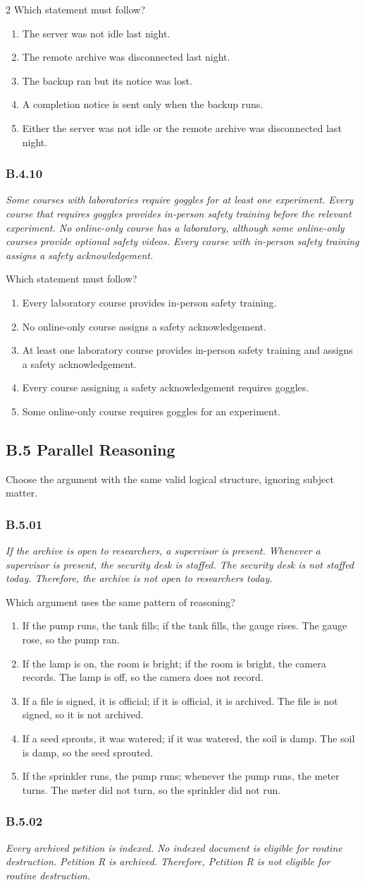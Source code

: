 \documentclass[10pt]{extarticle}
\newcommand{\choice}[1]{\item #1}
\newcommand{\bankitem}[1]{\subsubsection*{#1}}
\begin{document}
\begin{multicols}{2}
Which statement must follow?
\begin{enumerate}[label=(\alph*)]
  \choice{The server was not idle last night.}
  \choice{The remote archive was disconnected last night.}
  \choice{The backup ran but its notice was lost.}
  \choice{A completion notice is sent only when the backup runs.}
  \choice{Either the server was not idle or the remote archive was disconnected last night.}
\end{enumerate}
\bankitem{B.4.10}
\emph{Some courses with laboratories require goggles for at least one experiment. Every course that requires goggles provides in-person safety training before the relevant experiment. No online-only course has a laboratory, although some online-only courses provide optional safety videos. Every course with in-person safety training assigns a safety acknowledgement.}

Which statement must follow?
\begin{enumerate}[label=(\alph*)]
  \choice{Every laboratory course provides in-person safety training.}
  \choice{No online-only course assigns a safety acknowledgement.}
  \choice{At least one laboratory course provides in-person safety training and assigns a safety acknowledgement.}
  \choice{Every course assigning a safety acknowledgement requires goggles.}
  \choice{Some online-only course requires goggles for an experiment.}
\end{enumerate}
\subsection*{B.5 Parallel Reasoning}
Choose the argument with the same valid logical structure, ignoring subject matter.
\bankitem{B.5.01}
\emph{If the archive is open to researchers, a supervisor is present. Whenever a supervisor is present, the security desk is staffed. The security desk is not staffed today. Therefore, the archive is not open to researchers today.}

Which argument uses the same pattern of reasoning?
\begin{enumerate}[label=(\alph*)]
  \choice{If the pump runs, the tank fills; if the tank fills, the gauge rises. The gauge rose, so the pump ran.}
  \choice{If the lamp is on, the room is bright; if the room is bright, the camera records. The lamp is off, so the camera does not record.}
  \choice{If a file is signed, it is official; if it is official, it is archived. The file is not signed, so it is not archived.}
  \choice{If a seed sprouts, it was watered; if it was watered, the soil is damp. The soil is damp, so the seed sprouted.}
  \choice{If the sprinkler runs, the pump runs; whenever the pump runs, the meter turns. The meter did not turn, so the sprinkler did not run.}
\end{enumerate}
\bankitem{B.5.02}
\emph{Every archived petition is indexed. No indexed document is eligible for routine destruction. Petition R is archived. Therefore, Petition R is not eligible for routine destruction.}


\end{multicols}
\end{document}
